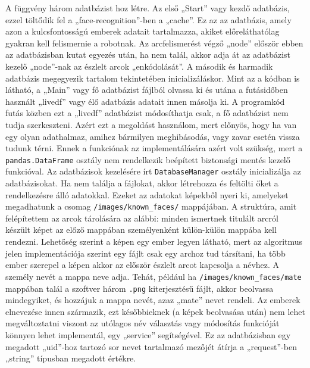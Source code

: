 A függvény három adatbázist hoz létre. Az első „Start” vagy kezdő adatbázis, ezzel töltődik fel a „face-recognition”-ben a „cache”. Ez az az adatbázis, amely azon a kulcsfontosságú emberek adatait tartalmazza, akiket előreláthatólag gyakran kell felismernie a robotnak. Az arcfelismerést végző „node” először ebben az adatbázisban kutat egyezés után, ha nem talál, akkor adja át az adatbázist kezelő „node”-nak az észlelt arcok „enkódolását”. A második és harmadik adatbázis megegyezik tartalom tekintetében inicializáláskor. Mint az a kódban is látható, a „Main” vagy fő adatbázist fájlból olvassa ki és utána a futásidőben használt „live\textunderscore df” vagy élő adatbázis adatait innen másolja ki. A programkód futás közben ezt a „live\textunderscore df” adatbázist módosíthatja csak, a fő adatbázist nem tudja szerkeszteni. Azért ezt a megoldást használom, mert előnyös, hogy ha van egy olyan adathalmaz, amihez bármilyen meghibásodás, vagy zavar esetén vissza tudunk térni. Ennek a funkciónak az implementálására azért volt szükség, mert a \verb|pandas.DataFrame| osztály nem rendelkezik beépített biztonsági mentés kezelő funkcióval. Az adatbázisok kezelésére írt \verb|DatabaseManager| osztály inicializálja az adatbázisokat. Ha nem találja a fájlokat, akkor létrehozza és feltölti őket a rendelkezésre álló adatokkal. Ezeket az adatokat képekből nyeri ki, amelyeket megadhatunk a csomag \verb|/images/known_faces/| mappájában. A struktúra, amit felépítettem az arcok tárolására az alábbi: minden ismertnek titulált arcról készült képet az előző mappában személyenként külön-külön mappába kell rendezni. Lehetőség szerint a képen egy ember legyen látható, mert az algoritmus jelen implementációja szerint egy fájlt csak egy archoz tud társítani, ha több ember szerepel a képen akkor az először észlelt arcot kapcsolja a névhez. A személy nevét a mappa neve adja. Tehát, például ha \verb|/images/known_faces/mate| mappában talál a szoftver három \verb|.png| kiterjesztésű fájlt, akkor beolvassa mindegyiket, és hozzájuk a mappa nevét, azaz „mate” nevet rendeli. Az emberek elnevezése innen származik, ezt későbbieknek (a képek beolvasása után) nem lehet megváltoztatni viszont az utólagos név választás vagy módosítás funkcióját könnyen lehet implementál, egy „service” segítségével. Ez az adatbázisban egy megadott „uid”-hoz tartozó sor nevet tartalmazó mezőjét átírja a „request”-ben „string” típusban megadott értékre.

